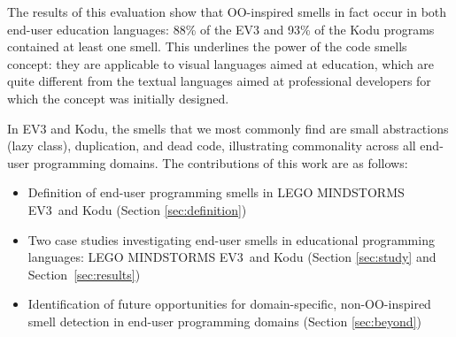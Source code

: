 \documentclass[conference]{IEEEtran}
\newcommand{\ms}{LEGO MINDSTORMS EV3}
\newcommand{\todo}[1]{\textbf{#1}}
\begin{document}
The results of this evaluation show that OO-inspired smells in fact occur in both end-user education languages: 88\% of the EV3 and 93\% of the Kodu programs contained at least one smell. This underlines the power of the code smells concept: they are applicable to visual languages aimed at education, which are quite different from the textual languages aimed at professional developers for which the concept was initially designed. 

In EV3 and Kodu, the smells that we most commonly find are small abstractions (lazy class), duplication, and dead code, illustrating commonality across all end-user programming domains. The contributions of this work are as follows:

\begin{itemize} \itemsep -0.25pt
	\item Definition of end-user programming smells in \ms~and Kodu  (Section \ref{sec:definition})
	\item Two case studies investigating end-user smells in educational programming languages: \ms~and Kodu   (Section \ref{sec:study} and Section~\ref{sec:results})
	\item Identification of future opportunities for domain-specific, non-OO-inspired smell detection in end-user programming domains (Section \ref {sec:beyond})
\end{itemize}


\end{document}
